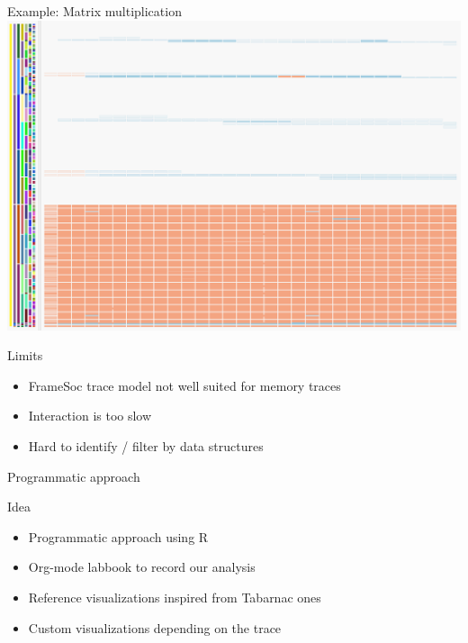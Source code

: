 \documentclass[xcolor={usenames,dvipsnames},hyperref={pdfusetitle}]{beamer}
\begin{document}
\begin{frame}{Example: Matrix multiplication}
{{{{                }{
                    \includegraphics[width=\textwidth]{ocelotl/Sharing-zoom.png}
                }
            }
        }
    }
    \pause
    \pause
    \pause
    \pause
\end{frame}%

\setcounter{framenumber}{\value{finalframe}}
\begin{frame}{Limits}
    \begin{itemize}
        \item FrameSoc trace model not well suited for memory traces
        \item Interaction is too slow
        \item Hard to identify / filter by data structures
    \end{itemize}
\end{frame}

\setcounter{framenumber}{\value{finalframe}}
\begin{frame}{Programmatic approach}
    \begin{block}{Idea}
        \begin{itemize}
            \item Programmatic approach using R
            \item Org-mode labbook to record our analysis
            \item Reference visualizations inspired from Tabarnac ones
            \item Custom visualizations depending on the trace
        \end{itemize}
    \end{block}
\end{frame}
\end{document}
